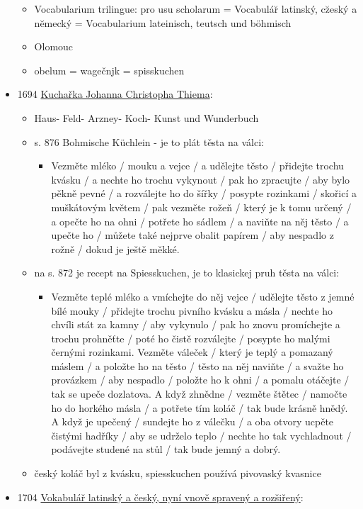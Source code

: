 \begin{itemize}
  \begin{itemize}
  \tightlist
  \item
    Vocabularium trilingue: pro usu scholarum = Vocabulár̆ latinský,
    cz̆eský a nĕmecký = Vocabularium lateinisch, teutsch und böhmisch
  \item
    Olomouc
  \item
    obelum = wagečnjk = spisskuchen
  \end{itemize}
\item
  1694
  \href{https://books.google.cz/books?id=PytAAAAAcAAJ&hl=cs&pg=PA876\#v=onepage&q&f=false}{Kuchařka
  Johanna Christopha Thiema}:

  \begin{itemize}
  \tightlist
  \item
    Haus- Feld- Arzney- Koch- Kunst und Wunderbuch
  \item
    s. 876 Bohmische Küchlein - je to plát těsta na válci:

    \begin{itemize}
    \tightlist
    \item
      Vezměte mléko / mouku a vejce / a udělejte těsto / přidejte trochu
      kvásku / a nechte ho trochu vykynout / pak ho zpracujte / aby bylo
      pěkně pevné / a rozválejte ho do šířky / posypte rozinkami /
      skořicí a muškátovým květem / pak vezměte rožeň / který je k tomu
      určený / a opečte ho na ohni / potřete ho sádlem / a naviňte na
      něj těsto / a upečte ho / můžete také nejprve obalit papírem / aby
      nespadlo z rožně / dokud je ještě měkké.
    \end{itemize}
  \item
    na s. 872 je recept na Spiesskuchen, je to klasickej pruh těsta na
    válci:

    \begin{itemize}
    \tightlist
    \item
      Vezměte teplé mléko a vmíchejte do něj vejce / udělejte těsto z
      jemné bílé mouky / přidejte trochu pivního kvásku a másla / nechte
      ho chvíli stát za kamny / aby vykynulo / pak ho znovu promíchejte
      a trochu prohněťte / poté ho čistě rozválejte / posypte ho malými
      černými rozinkami. Vezměte váleček / který je teplý a pomazaný
      máslem / a položte ho na těsto / těsto na něj naviňte / a svažte
      ho provázkem / aby nespadlo / položte ho k ohni / a pomalu
      otáčejte / tak se upeče dozlatova. A když zhnědne / vezměte štětec
      / namočte ho do horkého másla / a potřete tím koláč / tak bude
      krásně hnědý. A když je upečený / sundejte ho z válečku / a oba
      otvory ucpěte čistými hadříky / aby se udrželo teplo / nechte ho
      tak vychladnout / podávejte studené na stůl / tak bude jemný a
      dobrý.
    \end{itemize}
  \item
    český koláč byl z kvásku, spiesskuchen používá pivovaský kvasnice
  \end{itemize}
\item
  1704
  \href{https://bara.ujc.cas.cz/slovniky/vokabular/vokabular12.html}{Vokabulář
  latinský a český, nyní vnově spravený a rozšiřený}:


\end{itemize}
